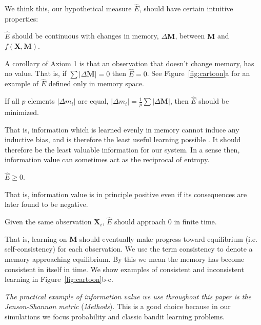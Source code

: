 We think this, our hypothetical measure $\hat E$, should have certain intuitive properties:

\begin{axiom}
	$\hat E$ should be continuous with changes in memory, $\Delta \mathbf{M}$, between $\mathbf{M}$ and $f(\mathbf{X},\mathbf{M})$.
\end{axiom}

A corollary of Axiom 1 is that an observation that doesn’t change memory, has no value. That is, if $\sum |\Delta \mathbf{M}| = 0$ then $\hat E = 0$. See Figure~\ref{fig:cartoon}a for an example of $\hat E$ defined only in memory space.

\begin{axiom}
	If all $p$ elements $|\Delta m_i|$ are equal, $|\Delta m_i| = \frac{1}{p} \sum |\Delta \mathbf{M}|$, then $\hat E$ should be minimized.
\end{axiom}

That is, information which is learned evenly in memory cannot induce any inductive bias, and is therefore the least useful learning possible \cite{Mitchell1980,Thrun1998}. It should therefore be the least valuable information for our system. In a sense then, information value can sometimes act as the reciprocal of entropy.

\begin{axiom}
	$\hat E \ge 0$.
\end{axiom}

That is, information value is in principle positive even if its consequences are later found to be negative.

\begin{axiom}
	Given the same observation $\mathbf{X}_i$, $\hat E$ should approach 0 in finite time.
\end{axiom}

That is, learning on $\mathbf{M}$ should eventually make progress toward equilibrium (i.e. self-consistency) for each observation. We use the term consistency to denote a memory approaching equilibrium. By this we mean the memory has become consistent in itself in time. We show examples of consistent and inconsistent learning in Figure~\ref{fig:cartoon}b-c.

\emph{The practical example of information value we use throughout this paper is the  Jenson-Shannon metric} (\emph{Methods}). This is a good choice because in our simulations we focus probability and classic bandit learning problems.


